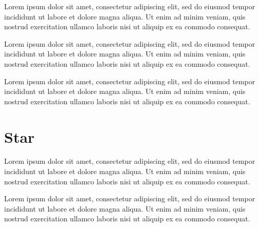 \documentclass[twoside]{report}
\begin{document}
Lorem ipsum dolor sit amet, consectetur adipiscing elit, sed do eiusmod tempor incididunt ut labore et dolore magna aliqua. Ut enim ad minim veniam, quis nostrud exercitation ullamco laboris nisi ut aliquip ex ea commodo consequat.

Lorem ipsum dolor sit amet, consectetur adipiscing elit, sed do eiusmod tempor incididunt ut labore et dolore magna aliqua. Ut enim ad minim veniam, quis nostrud exercitation ullamco laboris nisi ut aliquip ex ea commodo consequat.

Lorem ipsum dolor sit amet, consectetur adipiscing elit, sed do eiusmod tempor incididunt ut labore et dolore magna aliqua. Ut enim ad minim veniam, quis nostrud exercitation ullamco laboris nisi ut aliquip ex ea commodo consequat.

\section*{Star}
Lorem ipsum dolor sit amet, consectetur adipiscing elit, sed do eiusmod tempor incididunt ut labore et dolore magna aliqua. Ut enim ad minim veniam, quis nostrud exercitation ullamco laboris nisi ut aliquip ex ea commodo consequat.

Lorem ipsum dolor sit amet, consectetur adipiscing elit, sed do eiusmod tempor incididunt ut labore et dolore magna aliqua. Ut enim ad minim veniam, quis nostrud exercitation ullamco laboris nisi ut aliquip ex ea commodo consequat.
\end{document}
